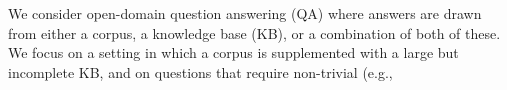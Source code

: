 We consider open-domain question answering (QA) where answers are drawn from either a corpus, a knowledge base (KB), or a combination of both of these.  We focus on a  setting in which a corpus is supplemented with a large but incomplete KB, and on questions that require non-trivial (e.g.,